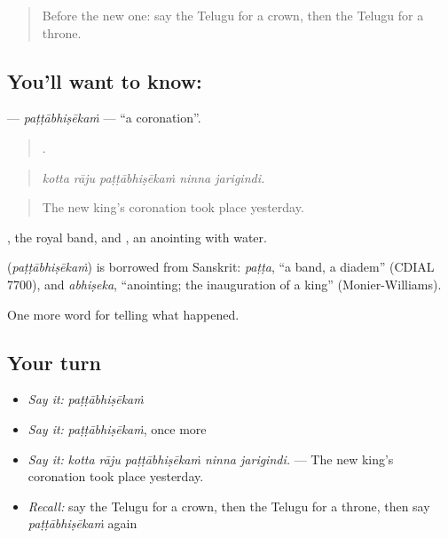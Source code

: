 \label{lesson:TE-C335-pattabhisekam}



\begin{quote}
Before the new one: say the Telugu for a crown, then the Telugu for a throne.
\end{quote}

\subsection*{You'll want to know: }
\textbf{} — \emph{paṭṭābhiṣēkaṁ} — \textquotedblleft{}a coronation\textquotedblright{}.

\begin{quote}
    .
\end{quote}

\begin{quote}
\emph{kotta rāju paṭṭābhiṣēkaṁ ninna jarigindi.}
\end{quote}

\begin{quote}
The new king's coronation took place yesterday.
\end{quote}

, the royal band, and , an anointing with water.

\begin{cousinweb}
\textbf{} (\emph{paṭṭābhiṣēkaṁ}) is borrowed from Sanskrit: \emph{paṭṭa}, \textquotedblleft{}a band, a diadem\textquotedblright{} (CDIAL 7700), and \emph{abhiṣeka}, \textquotedblleft{}anointing; the inauguration of a king\textquotedblright{} (Monier-Williams).
\end{cousinweb}

\begin{grammarlens}[title={What you've built}]
One more word for telling what happened.
\end{grammarlens}

\subsection*{Your turn}
\begin{itemize}
\raggedright
  \item \emph{Say it:} \emph{paṭṭābhiṣēkaṁ}
  \item \emph{Say it:} \emph{paṭṭābhiṣēkaṁ}, once more
  \item \emph{Say it:} \emph{kotta rāju paṭṭābhiṣēkaṁ ninna jarigindi.} — The new king's coronation took place yesterday.
  \item \emph{Recall:} say the Telugu for a crown, then the Telugu for a throne, then say \emph{paṭṭābhiṣēkaṁ} again
\end{itemize}

